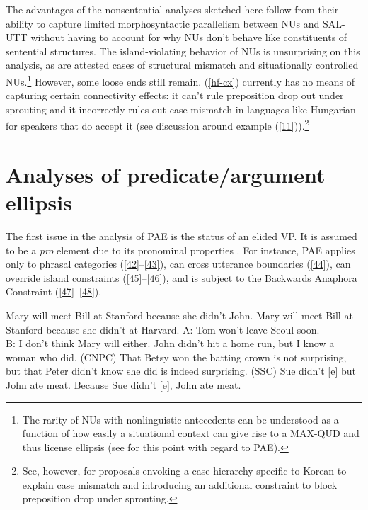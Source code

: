 \documentclass[output=paper
                ,modfonts
                ,nonflat
	        ,collection
	        ,collectionchapter
	        ,collectiontoclongg
 	        ,biblatex
                ,babelshorthands
                ,newtxmath
                ,draftmode
                ,colorlinks, citecolor=brown
]{./langsci/langscibook}
\begin{document}
{The advantages of the nonsentential analyses sketched here follow from their ability to capture limited morphosyntactic parallelism between NUs and SAL-UTT without having to account for why NUs don't behave like constituents of sentential structures. The island-violating behavior of NUs is unsurprising on this analysis, as are attested cases of structural mismatch and situationally controlled NUs.\footnote{The rarity of NUs with nonlinguistic antecedents can be understood as a function of how easily a situational context can give rise to a MAX-QUD and thus license ellipsis (see \citealt{Miller2014b} for this point with regard to PAE).} However, some loose ends still remain. (\ref{hf-cx}) currently has no means of capturing certain connectivity effects: it can't rule preposition drop out under sprouting and it incorrectly rules out case mismatch in languages like Hungarian for speakers that do accept it (see discussion around example (\ref{11})).\footnote{See, however, \citet{Kim2015} for proposals envoking a case hierarchy specific to Korean to explain case mismatch and introducing an additional constraint to block preposition drop under sprouting.}
%



\section{Analyses of predicate/argument ellipsis}
\label{sec-analyses-of-pred-ellipsis}
The first issue in the analysis of PAE is the status of an elided VP. It is assumed to be a \textit{pro} element due to its pronominal properties \citep[see][]{Lobeck1995, Lopez2000, Kim2006, Aelbrecht2015, Ginzburg2018}. For instance, PAE applies only to phrasal categories (\ref{42}--\ref{43}),
can cross utterance boundaries (\ref{44}), can override island constraints (\ref{45}--\ref{46}), and is subject to the Backwards Anaphora Constraint (\ref{47}--\ref{48}).

\ea *Mary will meet Bill at Stanford because she didn't  \jbtr John.\label{42}\z
\ea Mary will meet Bill at Stanford because she didn't \jbtr at Harvard.\label{43}\z
\ea A: Tom won't leave Seoul soon.\\
B: I don't think Mary will \jbtr either.\label{44}\z
\ea John didn't hit a home run, but I know a woman who did. (CNPC)\label{45}\z
\ea That Betsy won the batting crown is not surprising, but that
Peter didn't know she did \jbtr is indeed surprising. (SSC)\label{46}\z
\ea *Sue didn't [e] but John ate meat.\label{47}\z
\ea Because Sue didn't [e], John ate meat.\label{48}\z

}
\end{document}
